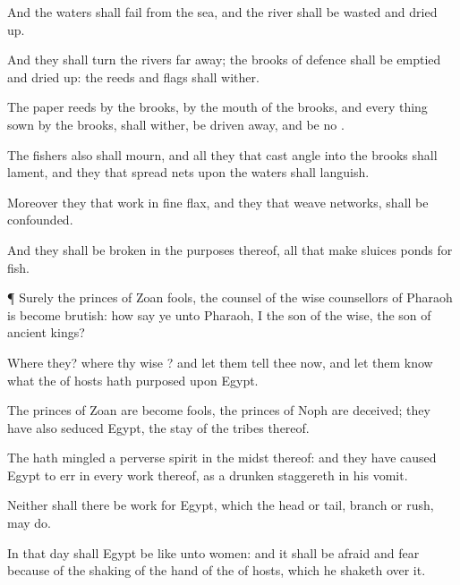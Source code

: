 {And the
waters shall
fail from the
sea, and the
river shall be
wasted and dried
up.

And they shall
turn the
rivers far
away;
{} the
brooks of
defence shall be
emptied and dried
up: the
reeds and
flags shall
wither.

The paper
reeds by the
brooks, by the
mouth of the
brooks, and every thing
sown by the
brooks, shall
wither, be driven
away, and be no
{}.

The
fishers also shall
mourn, and all they that
cast
angle into the
brooks shall
lament, and they that
spread
nets
upon the
waters shall
languish.

Moreover they that
work in
fine
flax, and they that
weave
networks, shall be
confounded.

And they shall be
broken in the
purposes thereof, all that
make
sluices
{}
ponds for
fish.


\par }{\PP {}¶ Surely the
princes of
Zoan
{}
fools, the
counsel of the
wise
counsellors of
Pharaoh is become
brutish: how
say ye unto
Pharaoh, I
{} the
son of the
wise, the
son of
ancient
kings?

Where
{} they?
where
{} thy
wise
{}? and let them
tell thee now, and let them
know what the
{} of
hosts hath
purposed upon
Egypt.

The
princes of
Zoan are become
fools, the
princes of
Noph are
deceived; they have also
seduced
Egypt,
{} the
stay of the
tribes thereof.

The
{} hath
mingled a
perverse
spirit in the
midst thereof: and they have caused
Egypt to
err in every
work thereof, as a
drunken
{}
staggereth in his
vomit.

Neither shall there be
{}
work for
Egypt, which the
head or
tail,
branch or
rush, may
do.

In that
day shall
Egypt be like unto
women: and it shall be
afraid and
fear
because of the
shaking of the
hand of the
{} of
hosts, which he
shaketh over it.

}
